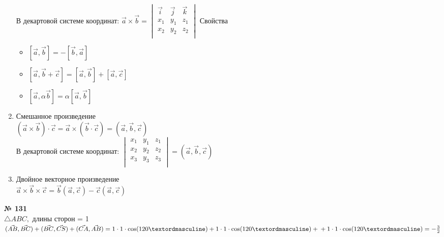 \documentclass[12pt]{article}
\newenvironment{task}[1][0]{\vspace{.5cm} {\textbf{№ #1} \vspace{.5cm}\\ }}{}
\begin{document}
\begin{enumerate}
{\begin{enumerate}
\end{enumerate}
В декартовой системе координат: 
$\vec{a} \times \vec{b} =
\begin{vmatrix}
	\vec{i} & \vec{j} & \vec{k}\\
	x_1 & y_1 & z_1\\
	x_2 & y_2 & z_2\\
\end{vmatrix}$
\newpage
Свойства
\begin{itemize}
	\item $[\vec{a}, \vec{b}]=-[\vec{b}, \vec{a}]$
	\item $[\vec{a}, \vec{b} + \vec{c}]=[\vec{a}, \vec{b}] + [\vec{a}, \vec{c}]$
	\item $[\vec{a}, \alpha \vec{b}] = \alpha [\vec{a}, \vec{b}]$
\end{itemize}
}
\item {Смешанное произведение\\
$(\vec{a} \times \vec{b}) \cdot \vec{c}=\vec{a} \times (\vec{b} \cdot \vec{c})=(\vec{a}, \vec{b}, \vec{c})$\\
В декартовой системе координат: 
$\begin{vmatrix}
	x_1 & y_1 & z_1\\
	x_2 & y_2 & z_2\\
	x_3 & y_3 & z_3\\
\end{vmatrix} = (\vec{a}, \vec{b}, \vec{c})$
}
\item{Двойное векторное произведение\\
$\vec{a} \times \vec{b} \times \vec{c} = \vec{b}(\vec{a}, \vec{c}) - \vec{c}(\vec{a}, \vec{c})$
}
\end{enumerate}

\begin{task}[131]
$\triangle ABC, $ длины сторон = 1\\
$(\vec{AB}, \vec{BC}) + (\vec{BC}, \vec{CS})+(\vec{CA}, \vec{AB}) = 1\cdot 1 \cdot \cos(120º)+ 1\cdot 1 \cdot \cos(120º)+\\+ 1\cdot 1 \cdot \cos(120º)=-\frac{3}{2}$\\

\end{task}
\end{document}
